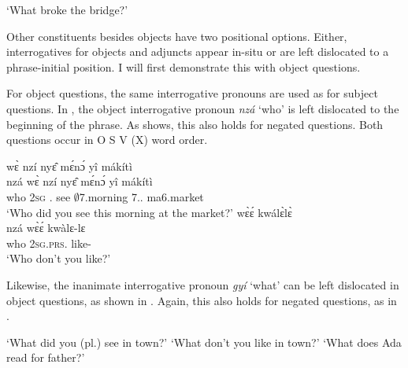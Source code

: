     \trans `What broke the bridge?'
\z

Other constituents besides objects have two positional options. Either, interrogatives for objects and adjuncts appear in-situ or are left dislocated to a phrase-initial position. I will first demonstrate this with object questions.


For object questions, the same interrogative pronouns are used as for subject questions. In , the object interrogative pronoun {\itshape nzá} `who' is left dislocated to the beginning of the phrase. As  shows, this also holds for negated questions. Both questions occur in O S V (X) word order.

\ea\label{OCQ1}
\ea \label{OCQ1a}
   wɛ̀ nzí nyɛ̂ mɛ́nɔ́ yî mákítì \\
      nzá wɛ̀ nzí nyɛ̂ mɛ́nɔ́ yî mákítì \\
             who 2\textsc{sg} {\PROG}.{\PST} see $\emptyset$7.morning 7.{\DEM}.{\PROX} ma6.market\\
    \trans `Who did you see this morning at the market?'
\ex \label{OCQ1b}
   wɛ̀ɛ́ kwálɛ̀lɛ̀ \\ 
  nzá wɛ̀ɛ́ kwàlɛ-lɛ \\
               who 2\textsc{sg}.\textsc{prs}.{\NEG} like-{\NEG} \\
    \trans `Who don't you like?'
\z
\z

\noindent Likewise, the inanimate interrogative pronoun {\itshape gyí} `what' can be left dislocated in object questions, as shown in . Again, this also holds for negated questions, as in .

\ea\label{OCQ2}
    \trans `What did you (pl.) see in town?'
    \trans `What don't you like in town?'
    \trans `What does Ada read for father?'
\z
\z

